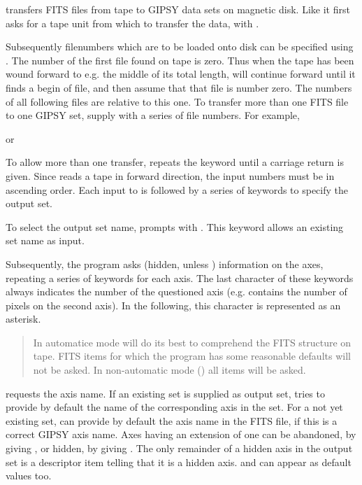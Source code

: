  transfers FITS files from tape to GIPSY data sets on
magnetic disk.  Like  it first asks for a tape unit from
which to transfer the data, with . 

Subsequently filenumbers which are to be loaded onto disk can be
specified using .  The number of the first file found
on tape is zero.  Thus when the tape has been wound forward to e.g.  the
middle of its total length,  will continue forward until
it finds a begin of file, and then assume that that file is number zero. 
The numbers of all following files are relative to this one.  To
transfer more than one FITS file to one GIPSY set, supply
 with a series of file numbers.  For example,


or


To allow more than one transfer,  repeats the keyword
 until a carriage return is given.  Since
 reads a tape in forward direction, the input numbers
must be in ascending order.  Each input to  is
followed by a series of keywords to specify the output set. 

To select the output set name,  prompts with
.  This keyword allows an existing set name as input. 

Subsequently, the program asks (hidden, unless ) 
information on the axes, repeating a series of keywords for each axis. 
The last character of these keywords always indicates the number of the 
questioned axis (e.g.  contains the number of pixels on 
the second axis). In the following, this character is represented as an asterisk. 

\begin{quote}
  In automatice mode  will do its best to
  comprehend the FITS structure on tape. FITS items for
  which the program has some reasonable defaults will
  not be asked. In non-automatic mode ()
  all items will be asked.
\end{quote}


 requests the axis name.  If an existing set is
supplied as output set,  tries to provide by default the
name of the corresponding axis in the set.  For a not yet existing set,
 can provide by default the axis name in the FITS file,
if this is a correct GIPSY axis name.  Axes having an extension of one
can be abandoned, by giving , or hidden, by giving
.  The only remainder of a hidden axis in the output set
is a descriptor item telling that it is a hidden axis.  
and  can appear as default values too. 

